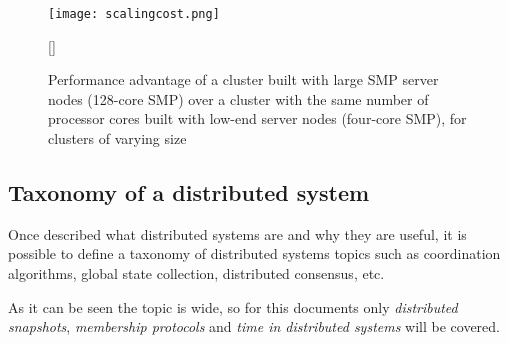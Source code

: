 \begin{figure}[!h]
\begin{center}
\texttt{[image: scalingcost.png]}
\caption{Performance advantage of a cluster built with large SMP server nodes
  (128-core SMP) over a cluster with the same number of processor cores built
  with low-end server nodes (four-core SMP), for clusters of varying
  size~\cite{Datacenter}}[]
\label{fig:highend}
\end{center}
\end{figure}

\subsection{Taxonomy of a distributed system}

Once described what distributed systems are and why they are useful, it is
possible to define a taxonomy of distributed systems topics such as coordination
algorithms, global state collection, distributed consensus, etc.

As it can be seen the topic is wide, so for this documents only
\textit{distributed snapshots}, \textit{membership protocols} and \textit{time
  in distributed systems} will be covered.

